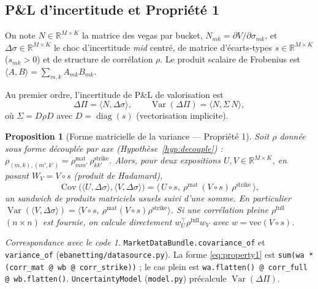 \documentclass[11pt,a4paper]{article}
\newcommand{\code}[1]{\texttt{#1}}
\DeclareMathOperator{\Var}{Var}
\DeclareMathOperator{\Cov}{Cov}
\newcommand{\R}{\mathbb{R}}
\newcommand{\dsig}{\Delta\sigma}
\newcommand{\dPi}{\Delta\Pi}
\theoremstyle{plain}
\newtheorem{proposition}[theoreme]{Proposition}
\theoremstyle{definition}
\theoremstyle{remark}
\newtheorem*{impl}{Correspondance avec le code}
\begin{document}
\subsection{P\&L d'incertitude et Propriété 1}
On note $N \in \R^{M\times K}$ la matrice des vegas par bucket,
$N_{mk} = \partial V / \partial \sigma_{mk}$, et $\dsig \in \R^{M\times K}$ le choc
d'incertitude \emph{mid} centré, de matrice d'écarts-types $s \in \R^{M\times K}$
($s_{mk}>0$) et de structure de corrélation $\rho$. Le produit scalaire de Frobenius
est $\langle A, B\rangle = \sum_{m,k} A_{mk} B_{mk}$.

Au premier ordre, l'incertitude de P\&L de valorisation est
\begin{equation}
\dPi = \langle N, \dsig\rangle,
\qquad
\Var(\dPi) = \langle N, \Sigma\, N\rangle,
\label{eq:dpi}
\end{equation}
où $\Sigma = D \rho D$ avec $D = \operatorname{diag}(s)$ (vectorisation implicite).

\begin{proposition}[Forme matricielle de la variance --- Propriété 1]
\label{prop:property1}
Soit $\rho$ donnée sous \emph{forme découplée par axe}
(Hypothèse~\ref{hyp:decouple}) : $\rho_{(m,k),(m',k')} = \rho^{\mathrm{mat}}_{mm'}\,
\rho^{\mathrm{strike}}_{kk'}$. Alors, pour deux expositions $U,V \in \R^{M\times K}$,
en posant $W_V = V \circ s$ (produit de Hadamard),
\begin{equation}
\Cov\big(\langle U,\dsig\rangle,\langle V,\dsig\rangle\big)
= \big\langle\, U\circ s,\ \rho^{\mathrm{mat}}\,(V\circ s)\,\rho^{\mathrm{strike}}\,\big\rangle,
\label{eq:property1}
\end{equation}
un \emph{sandwich} de produits matriciels usuels suivi d'une somme. En particulier
$\Var(\langle V,\dsig\rangle) = \langle V\circ s,\ \rho^{\mathrm{mat}}(V\circ s)
\rho^{\mathrm{strike}}\rangle$. Si une corrélation pleine $\rho^{\mathrm{full}}$
$(n\times n)$ est fournie, on calcule directement
$w_U^\top \rho^{\mathrm{full}} w_V$ avec $w = \mathrm{vec}(V\circ s)$.
\end{proposition}

\begin{impl}
\code{MarketDataBundle.covariance\_of} et \code{variance\_of}
(\code{ebanetting/datasource.py}). La forme \eqref{eq:property1} est
\code{sum(wa * (corr\_mat @ wb @ corr\_strike))} ; le cas plein est
\code{wa.flatten() @ corr\_full @ wb.flatten()}. \code{UncertaintyModel}
(\code{model.py}) précalcule $\Var(\dPi)$.
\end{impl}
\end{document}
